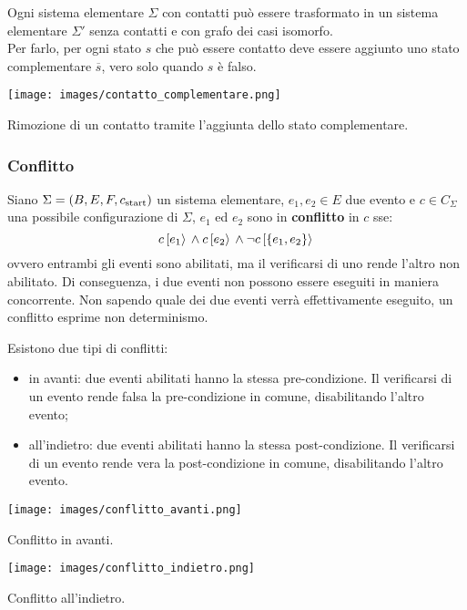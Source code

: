 \begin{rem}
    Ogni sistema elementare $\Sigma$ con contatti può essere trasformato in un sistema elementare $\Sigma'$ senza contatti e con grafo dei casi isomorfo.\\
    Per farlo, per ogni stato $s$ che può essere contatto deve essere aggiunto uno stato complementare $\overline{s}$, vero solo quando $s$ è falso. 
\end{rem}

\begin{marginfigure}[-10cm]
    \texttt{[image: images/contatto\_complementare.png]}
    \caption{Rimozione di un contatto tramite l'aggiunta dello stato complementare.}
    \label{fig:sistema_con_contatti}
\end{marginfigure}

\subsubsection{Conflitto}
\begin{defn}
    Siano $\Sigma = (B, E, F, c_{\textnormal{start}})$ un sistema elementare, $e_1, e_2 \in E$ due evento e $c \in C_{\Sigma}$ una possibile configurazione di $\Sigma$, $e_1$ ed $e_2$ sono in \textbf{conflitto} in $c$ sse:
    \[
        c\,[e_1\rangle\, \land c\,[e_2\rangle\, \land \lnot c\,[\left\{e_1, e_2\right\}\rangle\,
    \]
    ovvero entrambi gli eventi sono abilitati, ma il verificarsi di uno rende l'altro non abilitato.
    Di conseguenza, i due eventi non possono essere eseguiti in maniera concorrente.
    Non sapendo quale dei due eventi verrà effettivamente eseguito, un conflitto esprime non determinismo.

    Esistono due tipi di conflitti:
    \begin{itemize}
        \item in avanti: due eventi abilitati hanno la stessa pre-condizione. Il verificarsi di un evento rende falsa la pre-condizione in comune, disabilitando l'altro evento;
        \item all'indietro: due eventi abilitati hanno la stessa post-condizione. Il verificarsi di un evento rende vera la post-condizione in comune, disabilitando l'altro evento.
    \end{itemize}

    \begin{marginfigure}[-11cm]
        \texttt{[image: images/conflitto\_avanti.png]}
    \caption{Conflitto in avanti.}
    \label{fig:conflitto_avanti}
    \end{marginfigure}

    \begin{marginfigure}[-3cm]
        \texttt{[image: images/conflitto\_indietro.png]}
        \caption{Conflitto all'indietro.}
        \label{fig:conflitto_indietro}
    \end{marginfigure}
\end{defn}

